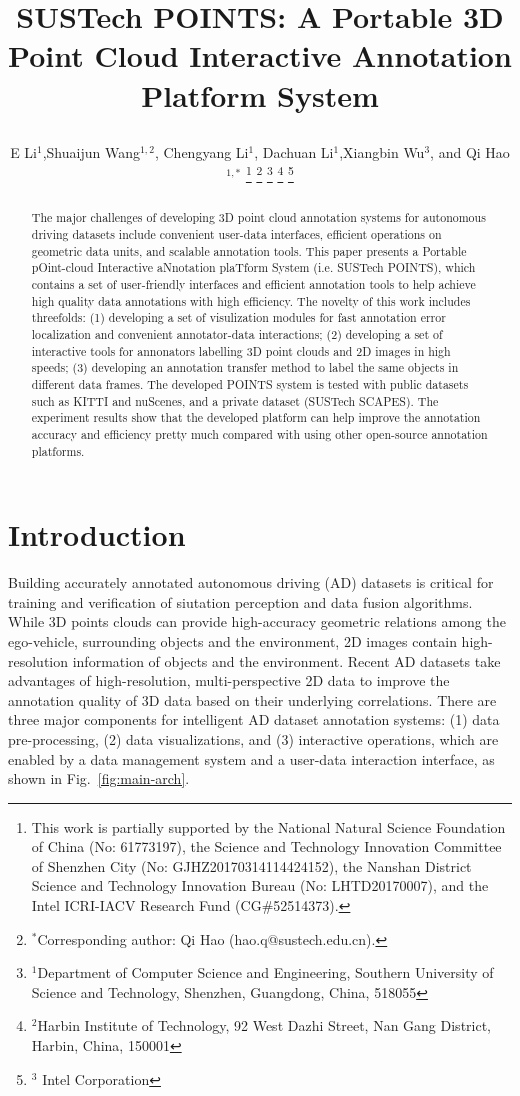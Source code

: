\documentclass[letterpaper, 10 pt, conference]{ieeeconf}  %
\title{\LARGE \bf
SUSTech POINTS: A Portable 3D Point Cloud Interactive Annotation Platform System

}
\author{E Li$^{1}$,Shuaijun Wang$^{1,2}$,  Chengyang Li$^{1}$, Dachuan Li$^{1}$,Xiangbin Wu$^{3}$, and Qi Hao$^{1,*}$%
\thanks{This work is partially supported by the National Natural Science Foundation of China (No: 61773197), the Science and Technology Innovation Committee of Shenzhen City (No: GJHZ20170314114424152), the Nanshan District Science and Technology Innovation Bureau (No: LHTD20170007), and the Intel ICRI-IACV Research Fund (CG$\#$52514373).}
\thanks{$^{*}$Corresponding author: Qi Hao (hao.q@sustech.edu.cn).}
\thanks{$^{1}$Department of Computer Science and Engineering,
Southern University of Science and Technology, Shenzhen, Guangdong, China, 518055}
\thanks{$^{2}$Harbin Institute of Technology,
92 West Dazhi Street, Nan Gang District, Harbin, China, 150001}%
\thanks{$^{3}$ Intel Corporation}%
}
\begin{document}
\maketitle
\thispagestyle{empty}
\pagestyle{empty}
\begin{abstract}

The major challenges of developing 3D point cloud annotation systems for autonomous driving datasets include
convenient user-data interfaces, efficient operations on geometric data units, and scalable annotation tools. 
This paper presents a {Portable pOint-cloud Interactive aNnotation plaTform System} (i.e. SUSTech POINTS), 
which contains a set of user-friendly interfaces and efficient annotation tools to help achieve high quality data annotations with high efficiency. 
The novelty of this work includes threefolds: 
(1) developing a set of visulization modules for fast annotation error localization and convenient annotator-data interactions; 
(2) developing a set of interactive tools for annonators labelling 3D point clouds and 2D images in high speeds;
(3) developing an annotation transfer method to label the same objects in different data frames. 
The developed POINTS system is tested with public datasets such as KITTI and nuScenes, and a private dataset (SUSTech SCAPES). 
The experiment results show that the developed platform can help improve the annotation accuracy and efficiency pretty much 
compared with using other open-source annotation platforms.



\end{abstract}






\section{Introduction}


Building accurately annotated autonomous driving (AD) datasets is critical for training and verification of siutation perception and data fusion algorithms. 
While 3D points clouds can provide high-accuracy geometric relations among the ego-vehicle, surrounding objects and the environment, 
2D images contain high-resolution information of objects and the environment. 
Recent AD datasets take advantages of high-resolution, multi-perspective 2D data to improve the annotation quality of 3D data 
based on their underlying correlations. 
There are three major components for intelligent AD dataset annotation systems: 
(1) data pre-processing, (2) data visualizations, and (3) interactive operations, 
which are enabled by a data management system and a user-data interaction interface, as shown in Fig.~\ref{fig:main-arch}.
\end{document}
